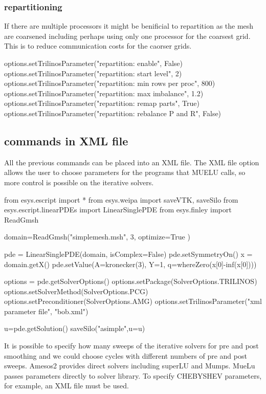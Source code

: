 \subsubsection{repartitioning}
If there are multiple processors it might be benificial to repartition as the mesh are coarsened including perhaps using only one processor for the coarsest grid.  This is to reduce communication costs for the caorser grids.
\begin{python}
options.setTrilinosParameter("repartition: enable", False)
options.setTrilinosParameter("repartition: start level", 2)
options.setTrilinosParameter("repartition: min rows per proc", 800)
options.setTrilinosParameter("repartition: max imbalance", 1.2)
options.setTrilinosParameter("repartition: remap parts", True)
options.setTrilinosParameter("repartition: rebalance P and R", False)
\end{python}


\subsection{commands in XML file}
All the previous commands can be placed into an XML file.  The XML file option allows the user to choose parameters for the programs that MUELU calls, so more control is possible on the iterative solvers.
\begin{python}
from esys.escript import *
from esys.weipa import saveVTK, saveSilo
from esys.escript.linearPDEs import LinearSinglePDE
from esys.finley import ReadGmsh

domain=ReadGmsh("simplemesh.msh", 3,  optimize=True )

pde = LinearSinglePDE(domain, isComplex=False)
pde.setSymmetryOn()
x = domain.getX()
pde.setValue(A=kronecker(3), Y=1, q=whereZero(x[0]-inf(x[0])))

options = pde.getSolverOptions()
options.setPackage(SolverOptions.TRILINOS)
options.setSolverMethod(SolverOptions.PCG)
options.setPreconditioner(SolverOptions.AMG)
options.setTrilinosParameter("xml parameter file", "bob.xml")

u=pde.getSolution()    
saveSilo("asimple",u=u) 
\end{python}

It is possible to specify how many sweeps of the iterative solvers for pre and post smoothing and we could choose cycles with different numbers of pre and post sweeps.  Amesos2 provides direct solvers including superLU and Mumps. MueLu passes parameters directly to solver library.  To specify CHEBYSHEV parameters, for example, an XML file must be used.

